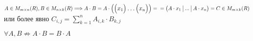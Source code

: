 \begin{definition}
    $A \in M_{m \times n}(R), B \in M_{n \times k}(R) \Longrightarrow A \cdot B = A \cdot 
    \large
    \begin{pmatrix}
        \begin{pmatrix}
            x_1
        \end{pmatrix}
        \dots
        \begin{pmatrix}
            x_n
        \end{pmatrix}
    \end{pmatrix} = \\\\
    \normalsize = 
    \begin{pmatrix}
        A \cdot x_1 \,\, \vrule \,\, ... \,\, \vrule \,\, A \cdot x_n 
    \end{pmatrix} = C \in M_{m \times k}(R)
    $ или более явно $C_{i, j} = \sum_{k = 1}^n A_{i,k} \cdot B_{k,j}$
\end{definition}

\quad
\begin{remark}
    $\forall A, B \not \Rightarrow A \cdot B = B \cdot A$\\
\end{remark}


